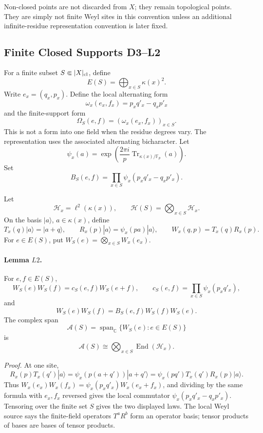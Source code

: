 Non-closed points are not discarded from \(X\); they remain topological points.
They are simply not finite Weyl sites in this convention unless an additional
infinite-residue representation convention is later fixed.

\subsection{Finite Closed Supports D3--L2}

For a finite subset \(S\Subset |X|_{\rm cl}\), define
\[
  E(S)=\bigoplus_{x\in S}\kappa(x)^2.
\]
Write \(e_x=(q_x,p_x)\).  Define the local alternating form
\[
  \omega_x(e_x,f_x)=p_xq'_x-q_xp'_x
\]
and the finite-support form
\[
  \Omega_S(e,f)=(\omega_x(e_x,f_x))_{x\in S}.
\]
This is not a form into one field when the residue degrees vary.  The
representation uses the associated alternating bicharacter.  Let
\[
  \psi_x(a)=
  \exp\!\left(\frac{2\pi i}{p}
  \operatorname{Tr}_{\kappa(x)/\mathbb F_p}(a)\right).
\]
Set
\[
  B_S(e,f)=\prod_{x\in S}\psi_x(p_xq'_x-q_xp'_x).
\]

Let
\[
  \mathcal H_x=\ell^2(\kappa(x)),\qquad
  \mathcal H(S)=\bigotimes_{x\in S}\mathcal H_x.
\]
On the basis \(|a\rangle\), \(a\in\kappa(x)\), define
\[
  T_x(q)|a\rangle=|a+q\rangle,\qquad
  R_x(p)|a\rangle=\psi_x(pa)|a\rangle,\qquad
  W_x(q,p)=T_x(q)R_x(p).
\]
For \(e\in E(S)\), put \(W_S(e)=\bigotimes_{x\in S}W_x(e_x)\).

\paragraph{Lemma \(L2\).}
For \(e,f\in E(S)\),
\[
  W_S(e)W_S(f)=c_S(e,f)W_S(e+f),\qquad
  c_S(e,f)=\prod_{x\in S}\psi_x(p_xq'_x),
\]
and
\[
  W_S(e)W_S(f)=B_S(e,f)W_S(f)W_S(e).
\]
The complex span
\[
  \mathcal A(S)=\operatorname{span}_{\mathbb C}\{W_S(e):e\in E(S)\}
\]
is
\[
  \mathcal A(S)\cong\bigotimes_{x\in S}\operatorname{End}(\mathcal H_x).
\]

\emph{Proof.}
At one site,
\[
  R_x(p)T_x(q')|a\rangle
  =
  \psi_x(p(a+q'))|a+q'\rangle
  =
  \psi_x(pq')T_x(q')R_x(p)|a\rangle .
\]
Thus \(W_x(e_x)W_x(f_x)=\psi_x(p_xq'_x)W_x(e_x+f_x)\), and dividing by the
same formula with \(e_x,f_x\) reversed gives the local commutator
\(\psi_x(p_xq'_x-q_xp'_x)\).  Tensoring over the finite set \(S\) gives the
two displayed laws.  The local Weyl source says the finite-field operators
\(T^aR^b\) form an operator basis; tensor products of bases are bases of
tensor products.

